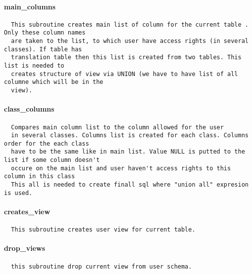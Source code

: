 \paragraph*{main\_columns\label{Apiis::Auth::AccessControl_--_used_by_the_runall_pl_and_access_control_pl_scripts_to_define_user_access_rights_main_columns}}
\begin{verbatim}
  This subroutine creates main list of column for the current table . Only these column names 
  are taken to the list, to which user have access rights (in several  classes). If table has 
  translation table then this list is created from two tables. This list is needed to 
  creates structure of view via UNION (we have to have list of all columne which will be in the 
  view).
\end{verbatim}
\paragraph*{class\_columns\label{Apiis::Auth::AccessControl_--_used_by_the_runall_pl_and_access_control_pl_scripts_to_define_user_access_rights_class_columns}}
\begin{verbatim}
  Compares main column list to the column allowed for the user 
  in several classes. Columns list is created for each class. Columns order for the each class 
  have to be the same like in main list. Value NULL is putted to the list if some column doesn't 
  occure on the main list and user haven't access rights to this column in this class
  This all is needed to create finall sql where "union all" expresion is used.
\end{verbatim}
\paragraph*{creates\_view\label{Apiis::Auth::AccessControl_--_used_by_the_runall_pl_and_access_control_pl_scripts_to_define_user_access_rights_creates_view}}
\begin{verbatim}
  This subroutine creates user view for current table.
\end{verbatim}
\paragraph*{drop\_views\label{Apiis::Auth::AccessControl_--_used_by_the_runall_pl_and_access_control_pl_scripts_to_define_user_access_rights_drop_views}}
\begin{verbatim}
  this subroutine drop current view from user schema.
\end{verbatim}

